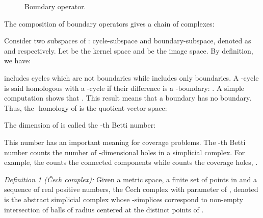 \documentclass[conference]{IEEEtran}
\makeatletter
\newcommand*{\etc}{\@ifnextchar{.}{etc}{etc.\@\xspace}}
\makeatother
\begin{document}
\begin{figure}[H]
\caption{Boundary operator.}
	\label{fig_boundary}
\end{figure} \vspace{-3mm}

The composition of boundary operators gives a chain of complexes:


Consider two subspaces of : cycle-subspace and
boundary-subspace, denoted as  and 
respectively. Let  be the kernel space and  be the image space. By definition, we have:

 includes cycles which are not boundaries while
 includes only boundaries.  A -cycle  is said homologous with a -cycle  if their
difference is a -boundary: . A simple computation shows that . This result means that a boundary has no
boundary. Thus, the -homology of  is the quotient vector space:


The dimension of  is called the -th Betti number:


This number has an important meaning for coverage problems. The 
-th Betti number counts the number of -dimensional holes in
a simplicial complex. For example, the  counts the connected
components while  counts the coverage holes,
\etc. \par

\textit{Definition 1 (\v{C}ech complex):} Given  a metric
space,  a finite set of points in  and  a sequence of real
positive numbers, the \v{C}ech complex with parameter  of
, denoted  is the abstract simplicial
complex whose -simplices correspond to non-empty intersection of
 balls of radius  centered at the  distinct
points of .\par
\end{document}
